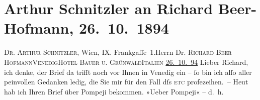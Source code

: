

         
         \newcommand{\erwaehntePersonen}{Personen: Richard Beer-Hofmann, Paul Scarron, Friedrich von Schiller}
         \newcommand{\erwaehnteOrte}{Orte: Frankgasse, Grand Hotel Bauer-Grünwald, I., Innere Stadt, Italien, Pompei, Rom, Venedig, Volkstheater, Wien}
         \newcommand{\erwaehnteWerke}{Werke: Anatol, Comödianten, Der Komödianten-Roman, Kabale und Liebe, Liebelei. Schauspiel in drei Akten, Sterben. Novelle}
               \section[Arthur Schnitzler an Richard Beer-Hofmann, 26. 10. 1894]{ Arthur Schnitzler an Richard Beer-Hofmann, 26. 10. 1894}\nopagebreak{}\rehead{ }\begin{ledgroupsized}[t]{13cm}\normalsize\beginnumbering \toendnotes[C]{\smallbreak\pagebreak[2]} 
\toendnotes[C]{\smallbreak}\pstart{}{\pb}\textsc{Dr. Arthur Schnitzler}, Wien,
                     IX. Frankgaſſe 1.\pend{}{\bigskip}\pstart{}Herrn Dr. \textsc{Richard Beer Hofmann}\pend{}\pstart{}\textsc{Venedig}\pend{}\pstart{}\textsc{Hotel Bauer u. Grünwald}\pend{}\pstart{}\textsc{Italien}\pend{}{\bigskip}\pstart
           \raggedleft{}{\pb}\uline{26. 10. 94}\pend
           \pstart
           Lieber Richard, ich denke, der Brief da trifft noch vor Ihnen in Venedig ein – ſo bin ich alſo aller peinvollen
               Gedanken ledig, die Sie mir für den Fall dſs \textsc{etc}
               profezeihen. – Heut hab ich Ihren Brief über Pompeji bekommen. »Ueber Pompeji« – d. h.

\end{ledgroupsized}
